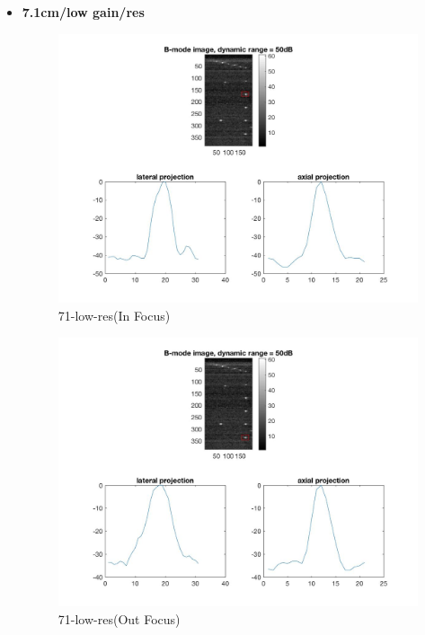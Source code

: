 \documentclass[12pts,a4paper]{article}
\begin{document}
\begin{itemize}
\pagebreak
\item{\textbf{7.1cm/low gain/res}}
\begin{center}
\end{center}
\begin{figure}[h]
    \centering
    \includegraphics[width=1.0\textwidth]{img_hw1/71-low-res1.jpg}
    \caption{71-low-res(In Focus)}
    \label{fig:mesh1}
\end{figure}
\pagebreak
\begin{figure}[h]
    \centering
    \includegraphics[width=1.0\textwidth]{img_hw1/71-low-res2.jpg}
    \caption{71-low-res(Out Focus)}
    \label{fig:mesh1}
\end{figure}
\pagebreak
\end{itemize}
\end{document}
